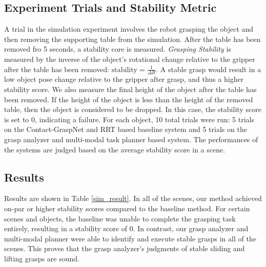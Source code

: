\documentclass[12pt]{ucsddissertation}
\begin{document}
\subsection{Experiment Trials and Stability Metric}
A trial in the simulation experiment involves the robot grasping the object and then removing the supporting table from the simulation. After the table has been removed fro 5 seconds, a stability core is measured. \emph{Grasping Stability} is measured by the inverse of the object's rotational change relative to the gripper after the table has been removed: $\textrm{stability} = \frac{1}{\Delta R}$. A stable grasp would result in a low object pose change relative to the gripper after grasp, and thus a higher stability score. We also measure the final height of the object after the table has been removed. If the height of the object is less than the height of the removed table, then the object is considered to be dropped. In this case, the stability score is set to 0, indicating a failure. For each object, 10 total trials were run: 5 trials on the Contact-GraspNet and RRT based baseline system and 5 trials on the grasp analyzer and multi-modal task planner based system. The performances of the systems are judged based on the average stability score in a scene.

\subsection{Results}
Results are shown in Table \ref{sim_result}. In all of the scenes, our method achieved on-par or higher stability scores compared to the baseline method. For certain scenes and objects, the baseline was unable to complete the grasping task entirely, resulting in a stability score of 0. In contrast, our grasp analyzer and multi-modal planner were able to identify and execute stable grasps in all of the scenes. This proves that the grasp analyzer's judgments of stable sliding and lifting grasps are sound.
\end{document}
